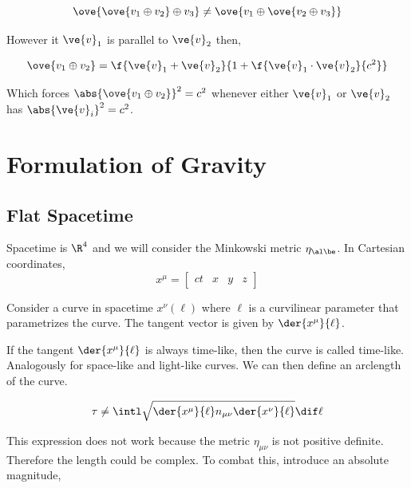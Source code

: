 \documentclass{article}
\newcommand{\mtrx}[1]{
    \begin{bmatrix}
    #1
    \end{bmatrix}
}
\begin{document}
\[ \ove{\ove{v_1 \oplus v_2} \oplus v_3} \neq \ove{v_1 \oplus \ove{v_2 \oplus v_3}} \]

However it $\ve{v}_1$ is parallel to $\ve{v}_2$ then,

\[ \ove{v_1 \oplus v_2} = \f{\ve{v}_1 + \ve{v}_2}{1 + \f{\ve{v}_1 \cdot \ve{v}_2}{c^2}} \]

Which forces $\abs{\ove{v_1 \oplus v_2}}^2 = c^2$ whenever either $\ve{v}_1$ or $\ve{v}_2$ has $\abs{\ve{v}_i}^2 = c^2$.

\section{Formulation of Gravity}

\subsection{Flat Spacetime}

Spacetime is $\R^4$ and we will consider the Minkowski metric $\eta_{\al\be}$. In Cartesian coordinates,
\[ x^\mu = \mtrx{ct& x & y & z} \]

Consider a curve in spacetime $x^\nu(\ell)$ where $\ell$ is a curvilinear parameter that parametrizes the curve. The tangent vector is given by $\der{x^\mu}{\ell}$.

\begin{center}
\end{center}

If the tangent $\der{x^\mu}{\ell}$ is always time-like, then the curve is called time-like. Analogously for space-like and light-like curves. We can then define an arclength of the curve.

\[ \tau \neq \intl \sqrt{\der{x^\mu}{\ell} n_{\mu\nu} \der{x^\nu}{\ell}} \dif \ell \]

This expression does not work because the metric $\eta_{\mu\nu}$ is not positive definite. Therefore the length could be complex. To combat this, introduce an absolute magnitude,
\end{document}
